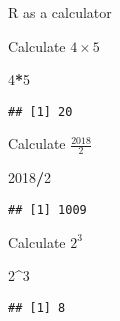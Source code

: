\documentclass[ignorenonframetext,]{beamer}
\newenvironment{Shaded}{\begin{snugshade}}{\end{snugshade}}
\newcommand{\DecValTok}[1]{\textcolor[rgb]{0.00,0.00,0.81}{#1}}
\newcommand{\OperatorTok}[1]{\textcolor[rgb]{0.81,0.36,0.00}{\textbf{#1}}}
\begin{document}
\begin{frame}[fragile]{R as a calculator}

Calculate \(4\times 5\)

\begin{Shaded}
\begin{Highlighting}[]
\DecValTok{4}\OperatorTok{*}\DecValTok{5}
\end{Highlighting}
\end{Shaded}

\begin{verbatim}
## [1] 20
\end{verbatim}

Calculate \(\frac{2018}{2}\)

\begin{Shaded}
\begin{Highlighting}[]
\DecValTok{2018}\OperatorTok{/}\DecValTok{2}
\end{Highlighting}
\end{Shaded}

\begin{verbatim}
## [1] 1009
\end{verbatim}

Calculate \(2^3\)

\begin{Shaded}
\begin{Highlighting}[]
\DecValTok{2}\OperatorTok{^}\DecValTok{3}
\end{Highlighting}
\end{Shaded}

\begin{verbatim}
## [1] 8
\end{verbatim}

\end{frame}
\end{document}
